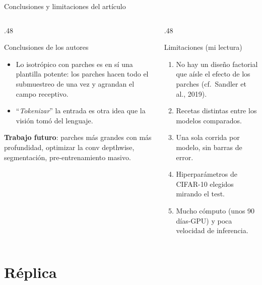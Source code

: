 \documentclass[aspectratio=169,xcolor=table]{beamer}
\begin{document}
\begin{frame}{Conclusiones y limitaciones del artículo}
  \begin{columns}[T]
    \begin{column}{.48\textwidth}
      \begin{block}{Conclusiones de los autores}
        \small
        \begin{itemize}
          \item Lo isotrópico con parches es en sí una plantilla potente: los parches hacen todo el
          submuestreo de una vez y agrandan el campo receptivo.
          \item ``\emph{Tokenizar}'' la entrada es otra idea que la visión tomó del lenguaje.
        \end{itemize}
        \textbf{Trabajo futuro}: parches más grandes con más profundidad, optimizar la conv depthwise,
        segmentación, pre-entrenamiento masivo.
      \end{block}
    \end{column}
    \begin{column}{.48\textwidth}
      \begin{alertblock}{Limitaciones (mi lectura)}
        \small
        \begin{enumerate}
          \item No hay un diseño factorial que aísle el efecto de los parches (cf.\ Sandler et al., 2019).
          \item Recetas distintas entre los modelos comparados.
          \item Una sola corrida por modelo, sin barras de error.
          \item Hiperparámetros de CIFAR-10 elegidos mirando el test.
          \item Mucho cómputo (unos 90 días-GPU) y poca velocidad de inferencia.
        \end{enumerate}
      \end{alertblock}
    \end{column}
  \end{columns}
\end{frame}

\section{Réplica}


\end{document}
